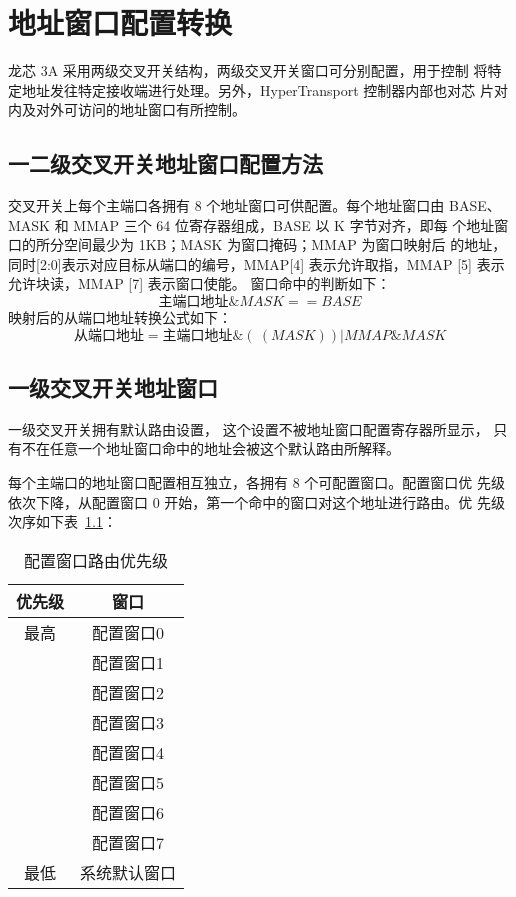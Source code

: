 \chapter{地址窗口配置转换}

龙芯 3A 采用两级交叉开关结构，两级交叉开关窗口可分别配置，用于控制
将特定地址发往特定接收端进行处理。另外，HyperTransport 控制器内部也对芯
片对内及对外可访问的地址窗口有所控制。

\section{一二级交叉开关地址窗口配置方法}

交叉开关上每个主端口各拥有 8 个地址窗口可供配置。每个地址窗口由 BASE、MASK 和
MMAP 三个 64 位寄存器组成，BASE 以 K 字节对齐，即每 个地址窗口的所分空间最少为
1KB；MASK 为窗口掩码；MMAP 为窗口映射后
的地址，同时[2:0]表示对应目标从端口的编号，MMAP[4] 表示允许取指，MMAP [5]
表示允许块读，MMAP [7] 表示窗口使能。 窗口命中的判断如下：
\begin{displaymath}
  主端口地址 \& MASK == BASE
\end{displaymath}
映射后的从端口地址转换公式如下：
\begin{displaymath}
  从端口地址 = 主端口地址 \& (~(MASK)) | MMAP \& MASK
\end{displaymath}

\section{一级交叉开关地址窗口}

一级交叉开关拥有默认路由设置， 这个设置不被地址窗口配置寄存器所显示，
只有不在任意一个地址窗口命中的地址会被这个默认路由所解释。

每个主端口的地址窗口配置相互独立，各拥有 8 个可配置窗口。配置窗口优
先级依次下降，从配置窗口 0 开始，第一个命中的窗口对这个地址进行路由。优
先级次序如下表~\ref{tab:addrWinPriority}：
\begin{table}
  \centering
  \begin{tabular}{|c|c|} \hline
    优先级 &   窗口       \\ \hline
      最高 & 配置窗口0    \\
           & 配置窗口1    \\
           & 配置窗口2    \\
           & 配置窗口3    \\
           & 配置窗口4    \\
           & 配置窗口5    \\
           & 配置窗口6    \\
           & 配置窗口7    \\
      最低 & 系统默认窗口 \\ \hline
  \end{tabular}
  \caption{配置窗口路由优先级}
  \label{tab:addrWinPriority}
\end{table}


